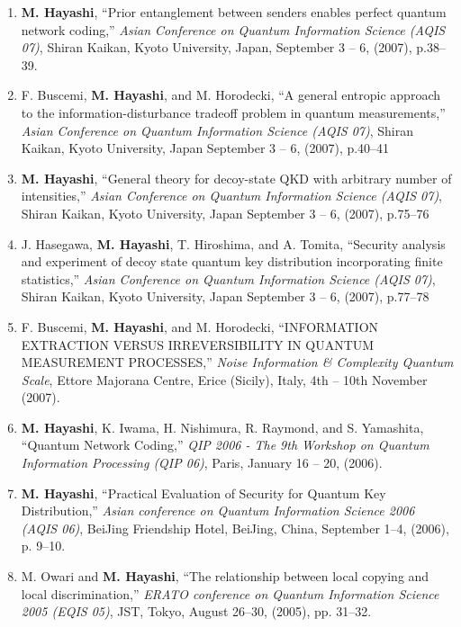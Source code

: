 \documentclass[a4paper,12pt,oneside]{article}
\begin{document}
\begin{enumerate}
\item
\textbf{M. Hayashi}, ``Prior entanglement between senders enables perfect quantum network coding,'' {\em Asian Conference on Quantum Information Science (AQIS 07)}, 
Shiran Kaikan, Kyoto University, Japan, 
September 3 -- 6, (2007), p.38--39.

\item
F. Buscemi, \textbf{M. Hayashi}, and M. Horodecki, ``A general entropic approach to the information-disturbance tradeoff problem in quantum measurements,'' 
{\em Asian Conference on Quantum Information Science (AQIS 07)}, 
Shiran Kaikan, Kyoto University, Japan September 3 -- 6, (2007), p.40--41

\item
\textbf{M. Hayashi}, ``General theory for decoy-state QKD with arbitrary number of intensities,'' 
{\em Asian Conference on Quantum Information Science (AQIS 07)}, 
Shiran Kaikan, Kyoto University, Japan September 3 -- 6, (2007), p.75--76

\item
J. Hasegawa, \textbf{M. Hayashi}, T. Hiroshima, and A. Tomita, 
``Security analysis and experiment of decoy state quantum key distribution incorporating finite statistics,'' 
{\em Asian Conference on Quantum Information Science (AQIS 07)}, 
Shiran Kaikan, Kyoto University, Japan September 3 -- 6, (2007), p.77--78

\item
F. Buscemi, \textbf{M. Hayashi}, and M. Horodecki, ``INFORMATION EXTRACTION VERSUS IRREVERSIBILITY IN QUANTUM MEASUREMENT PROCESSES,'' 
{\em Noise Information \& Complexity \@ Quantum Scale}, 
Ettore Majorana Centre, Erice (Sicily), Italy, 4th -- 10th November (2007). 


\item
\textbf{M. Hayashi}, K. Iwama, H. Nishimura, R. Raymond, and S. Yamashita, ``Quantum Network Coding,'' 
{\em QIP 2006 - The 9th Workshop on Quantum Information Processing (QIP 06)}, 
Paris, January 16 -- 20, (2006).


\item
\textbf{M. Hayashi}, ``Practical Evaluation of Security for Quantum Key Distribution,'' 
{\em Asian conference on Quantum Information Science 2006 (AQIS 06)}, 
BeiJing Friendship Hotel, BeiJing, China, September 1--4, (2006), p. 9--10.


\item
M. Owari and \textbf{M. Hayashi}, ``The relationship between local copying and local discrimination,'' 
{\em ERATO conference on Quantum Information Science 2005 (EQIS 05)}, 
JST, Tokyo, August 26--30, (2005), pp. 31--32.


\end{enumerate}
\end{document}
